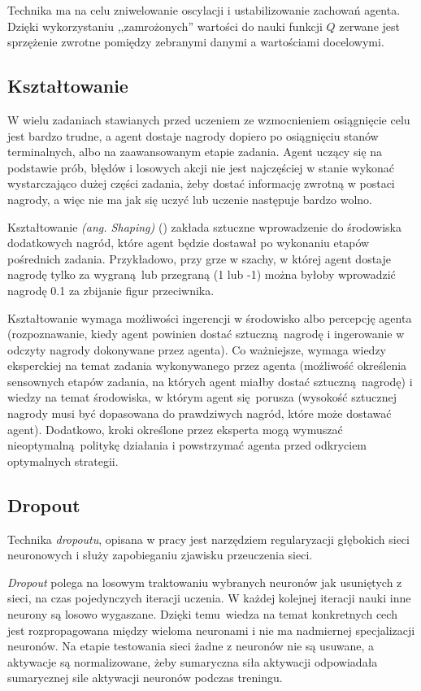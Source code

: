 \documentclass[polish,master,a4paper,oneside]{ppfcmthesis}
\begin{document}
Technika ma na celu zniwelowanie oscylacji i ustabilizowanie zachowań agenta. Dzięki wykorzystaniu ,,zamrożonych'' wartości do nauki funkcji $Q$ zerwane jest sprzężenie zwrotne pomiędzy zebranymi danymi a wartościami docelowymi.

\subsection{Kształtowanie}\label{shaping}
W wielu zadaniach stawianych przed uczeniem ze wzmocnieniem osiągnięcie celu jest bardzo trudne, a agent dostaje nagrody dopiero po osiągnięciu stanów terminalnych, albo na zaawansowanym etapie zadania. Agent uczący się na podstawie prób, błędów i losowych akcji nie jest najczęściej w stanie wykonać wystarczająco dużej części zadania, żeby dostać informację zwrotną w postaci nagrody, a więc nie ma jak się uczyć lub uczenie następuje bardzo wolno.

Kształtowanie \textit{(ang. Shaping)} (\cite{Mataric94rewardfunctions}) zakłada sztuczne wprowadzenie do środowiska dodatkowych nagród, które agent będzie dostawał po wykonaniu etapów pośrednich zadania. Przykładowo, przy grze w szachy, w której agent dostaje nagrodę tylko za wygraną lub przegraną (1 lub -1) można byłoby wprowadzić nagrodę 0.1 za zbijanie figur przeciwnika.

Kształtowanie wymaga możliwości ingerencji w środowisko albo percepcję agenta (rozpoznawanie, kiedy agent powinien dostać sztuczną nagrodę i ingerowanie w odczyty nagrody dokonywane przez agenta). Co ważniejsze, wymaga wiedzy eksperckiej na temat zadania wykonywanego przez agenta (możliwość określenia sensownych etapów zadania, na których agent miałby dostać sztuczną nagrodę) i wiedzy na temat środowiska, w którym agent się porusza (wysokość sztucznej nagrody musi być dopasowana do prawdziwych nagród, które może dostawać agent). Dodatkowo, kroki określone przez eksperta mogą wymuszać nieoptymalną politykę działania i powstrzymać agenta przed odkryciem optymalnych strategii.

\subsection{Dropout}\label{dropout}

Technika \textit{dropoutu}, opisana w pracy \cite{Srivastava:2014:DSW:2627435.2670313} jest narzędziem regularyzacji głębokich sieci neuronowych i służy zapobieganiu zjawisku przeuczenia sieci.

\textit{Dropout} polega na losowym traktowaniu wybranych neuronów jak usuniętych z sieci, na czas pojedynczych iteracji uczenia. W każdej kolejnej iteracji nauki inne neurony są losowo wygaszane. Dzięki temu wiedza na temat konkretnych cech jest rozpropagowana między wieloma neuronami i nie ma nadmiernej specjalizacji neuronów. Na etapie testowania sieci żadne z neuronów nie są usuwane, a aktywacje są normalizowane, żeby sumaryczna siła aktywacji odpowiadała sumarycznej sile aktywacji neuronów podczas treningu.
\end{document}
